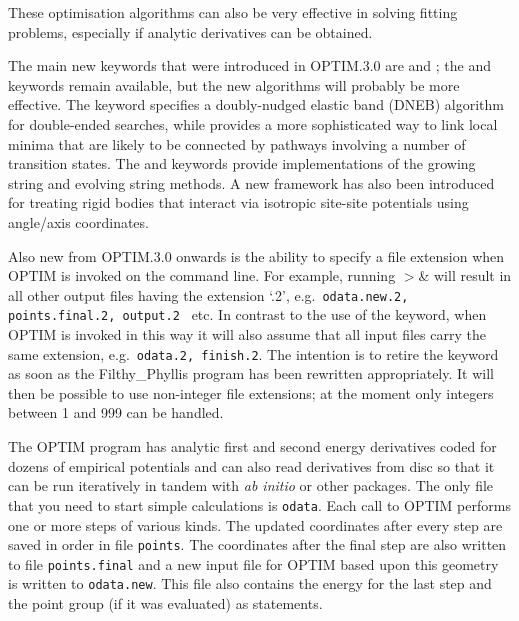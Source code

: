 These optimisation algorithms can also be
very effective in solving fitting problems, especially if analytic derivatives 
can be obtained.

The main new keywords that were introduced in
OPTIM.3.0 are  and ;
the {} and  keywords remain available, but the new algorithms
will probably be more effective. The  keyword specifies a
doubly-nudged elastic band (DNEB) algorithm for double-ended searches,\cite{TrygubenkoW04}
while  provides a more sophisticated way to link local minima
that are likely to be connected by pathways involving a number of transition states.
The  and  keywords provide implementations of the
growing string and evolving string methods.\cite{ERV02,PetersHBC04}
A new framework has also been introduced for treating rigid bodies that interact
via isotropic site-site potentials using angle/axis coordinates.\cite{Wales05}

Also new from OPTIM.3.0 onwards is the ability to specify a file extension when OPTIM is invoked on the
command line. For example, running 
{  \qquad $>$\& }
\noindent will result in all other output files having the 
extension `.2', e.g.~{\tt odata.new.2, points.final.2, output.2 } etc.
In contrast to the use of the {} keyword, when OPTIM is invoked in this way
it will also assume that all input files carry the same extension, e.g.~{\tt odata.2, finish.2}.
The intention is to retire the {} keyword as soon as the Filthy\_Phyllis program
has been rewritten appropriately. It will then be possible to use non-integer file extensions;
at the moment only integers between 1 and 999 can be handled.

The OPTIM program has analytic first and second energy derivatives coded for dozens of
empirical potentials and can also read derivatives from disc so that it can be run
iteratively in tandem with {\it ab initio\/} or other packages. 
The only file that you need to start simple calculations is {\tt odata}. 
Each call to OPTIM performs one or more steps of various kinds.
The updated coordinates after every step are saved in order
in file {\tt points}. The coordinates after the final step are also written to file
{\tt points.final} and a new input file for OPTIM based upon this geometry is written
to {\tt odata.new}. This file also contains the energy for the last step and
the point group (if it was evaluated) as  statements.


